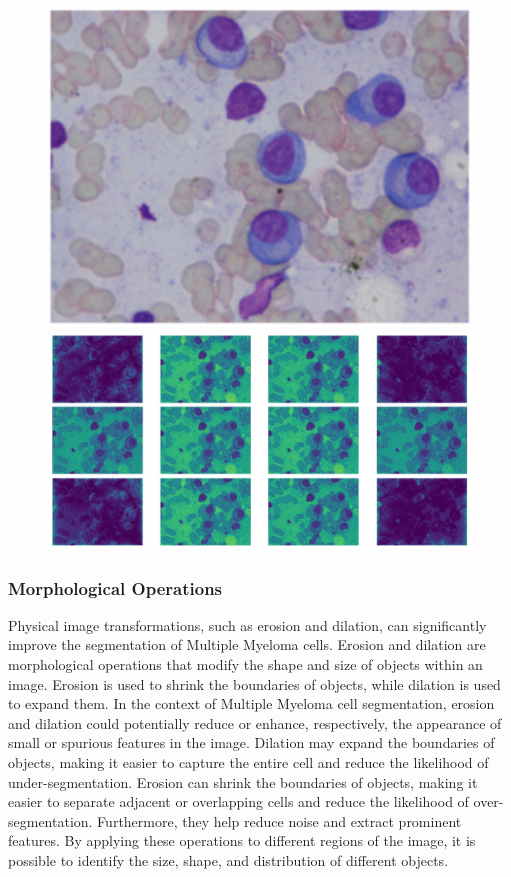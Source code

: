 \documentclass{article}
\begin{document}
\begin{figure}
  \centering
  \begin{minipage}{.5\textwidth}
    \centering
    \includegraphics[width=.4\linewidth]{1.png}
  \end{minipage}%
  \begin{minipage}{.4\textwidth}
    \centering
    \includegraphics[width=.6\linewidth]{2.jpg}
  \end{minipage}
\end{figure}

\subsubsection{Morphological Operations}

Physical image transformations, such as erosion and dilation, can significantly improve the segmentation of Multiple Myeloma cells. Erosion and dilation are morphological operations that modify the shape and size of objects within an image. Erosion is used to shrink the boundaries of objects, while dilation is used to expand them. In the context of Multiple Myeloma cell segmentation, erosion and dilation could potentially reduce or enhance, respectively, the appearance of small or spurious features in the image. Dilation may expand the boundaries of objects, making it easier to capture the entire cell and reduce the likelihood of under-segmentation. Erosion can shrink the boundaries of objects, making it easier to separate adjacent or overlapping cells and reduce the likelihood of over-segmentation. Furthermore, they help reduce noise and extract prominent features. By applying these operations to different regions of the image, it is possible to identify the size, shape, and distribution of different objects.
\end{document}
